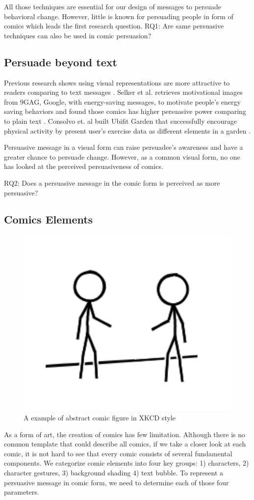 All those techniques are essential for our design of messages to persuade behavioral change. However, little is known for persuading people in form of comics which leads the first research question. RQ1: Are same persuasive techniques can also be used in comic persuasion?

\subsection{Persuade beyond text}
Previous research shows using visual representations are more attractive to readers comparing to text messages \cite{selker2015sweetbuildinggreeter,consolvo2008activity}. Selker et al. retrieves motivational images from 9GAG, Google, with energy-saving messages, to motivate people's energy saving behaviors and found those comics has higher persuasive power comparing to plain text \cite{selker2015sweetbuildinggreeter}. Consolvo et. al built Ubifit Garden that successfully encourage physical activity by present user's exercise data as different elements in a garden \cite{consolvo2008activity}.

Persuasive message in a visual form can raise persuadee's awareness and have a greater chance to persuade change. However, as a common visual form, no one has looked at the perceived persuasiveness of comics.

RQ2: Does a persuasive message in the comic form is perceived as more persuasive?

\subsection{Comics Elements}
\begin{figure}
  \centering
  \includegraphics[width=0.3\columnwidth]{figures/xkcd_example}
  \caption{A example of abstract comic figure in XKCD style}
  \label{fig:xkcd}
\end{figure}

As a form of art, the creation of comics has few limitation. Although there is no common template that could describe all comics, if we take a closer look at each comic, it is not hard to see that every comic consists of several fundamental components. We categorize comic elements into four key groups: 1) characters, 2) character gestures, 3) background shading 4) text bubble. To represent a persuasive message in comic form, we need to determine each of those four parameters.

